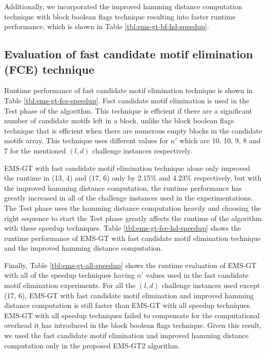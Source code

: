 	

	Additionally, we incorporated the improved hamming distance computation technique with block boolean flags technique resulting into faster runtime performance, which is shown in Table \ref{tbl:ems-gt-bf-hd-speedup}.

	


	\subsection{Evaluation of fast candidate motif elimination (FCE) technique}
	Runtime performance of fast candidate motif elimination technique is shown in Table \ref{tbl:ems-gt-fce-speedup}. Fast candidate motif elimination is used in the Test phase of the algorithm. This technique is efficient if there are a significant number of candidate motifs left in a block, unlike the block boolean flags technique that is efficient when there are numerous empty blocks in the candidate motifs array. This technique uses different values for $n'$ which are 10, 10, 9, 8 and 7 for the mentioned $(l, d)$ challenge instances respectively. 

	

	EMS-GT with fast candidate motif elimination technique alone only improved the runtime in (13, 4) and (17, 6) only by 2.15\% and 4.23\% respectively, but with the improved hamming distance computation, the runtime performance has greatly increased in all of the challenge instances used in the experimentations. The Test phase uses the hamming distance computation heavily and choosing the right sequence to start the Test phase greatly affects the runtime of the algorithm with these speedup techniques. Table \ref{tbl:ems-gt-fce-hd-speedup} shows the runtime performance of EMS-GT with fast candidate motif elimination technique and the improved hamming distance computation.

	

	Finally, Table \ref{tbl:ems-gt-all-speedup} shows the runtime evaluation of EMS-GT with all of the speedup techniques having $n'$ values used in the fast candidate motif elimination experiments. For all the $(l, d)$ challenge instances used except (17, 6), EMS-GT with fast candidate motif elimination and improved hamming distance computation is still faster than EMS-GT with all speedup techniques. EMS-GT with all speedup techniques failed to compensate for the computational overhead it has introduced in the block boolean flags technique. Given this result, we used the fast candidate motif elimination and improved hamming distance computation only in the proposed EMS-GT2 algorithm.

